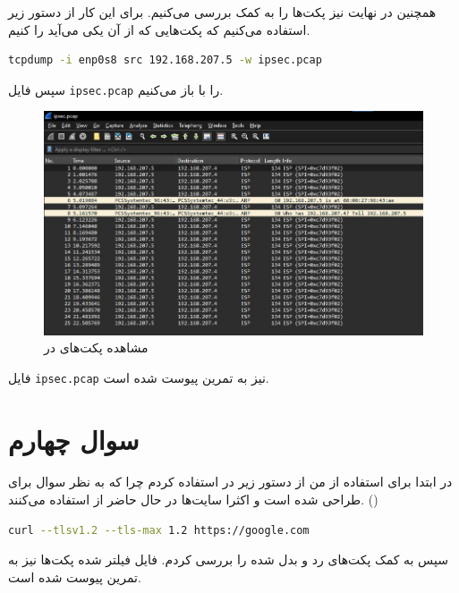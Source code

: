 \documentclass[]{article}
\begin{document}
همچنین در نهایت نیز پکت‌ها را به کمک
بررسی می‌کنیم. برای این کار از دستور زیر استفاده می‌کنیم که پکت‌هایی که از آن یکی
می‌آید را
کنیم.
\begin{latin}
\begin{lstlisting}[language=sh]
tcpdump -i enp0s8 src 192.168.207.5 -w ipsec.pcap
\end{lstlisting}
\end{latin}
سپس فایل
\verb|ipsec.pcap|
را با
باز می‌کنیم.
\begin{figure}[H]
    \centering
    \includegraphics[scale=0.6]{pics/ipsec-pcap.jpg}
    \caption{مشاهده پکت‌های  در }
\end{figure}
فایل
\verb|ipsec.pcap|
نیز به تمرین پیوست شده است.
\section*{سوال چهارم}
در ابتدا برای استفاده از
من از دستور زیر در
استفاده کردم چرا که به نظر سوال برای 
طراحی شده است و اکثرا سایت‌ها در حال حاضر از
استفاده می‌کنند.
()
\begin{latin}
\begin{lstlisting}[language=sh]
curl --tlsv1.2 --tls-max 1.2 https://google.com
\end{lstlisting}
\end{latin}
سپس به کمک
پکت‌های رد و بدل شده را بررسی کردم. فایل فیلتر شده پکت‌ها نیز به تمرین پیوست شده است.
\end{document}

